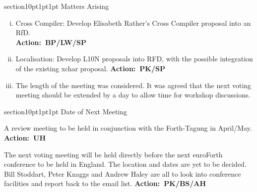 \documentclass{article}
\makeatletter
\newcommand{\action}[1]{%
	\mbox{}\hfill \textbf{Action:~#1}%
}
\renewcommand{\section}{\@startsection
	{section}{1}{0pt}{1pt}{1pt}
	{\normalfont\bfseries}
}
\makeatother
\begin{document}
\section{Matters Arising}
\label{matters}
\begin{enumerate}[i)]
	\item \textsf{Cross Compiler:}
		Develop Elisabeth Rather's Cross Compiler proposal into an
		RfD. \\
		\action{BP/LW/SP}

	\item \textsf{Localisation:}
		Develop L10N proposals into RFD, with the possible integration of
		the existing \textsf{xchar} proposal.
		\action{PK/SP}

	\item The length of the meeting was considered.  It was agreed that the
		next voting meeting should be extended by a day to allow time for
		workshop discussions.
\end{enumerate}

\section{Date of Next Meeting}
\label{next}

	A review meeting to be held in conjunction with the Forth-Tagung
	in April/May.
	\action{UH}

	The next voting meeting will be held directly before the next
	euroForth conference to be held in England.  The location and dates
	are yet to be decided.  Bill Stoddart, Peter Knaggs and Andrew Haley
	are all to look into conference facilities and report back to the
	email list.
	\action{PK/BS/AH}
\end{document}
